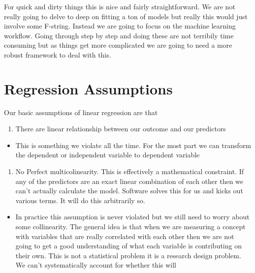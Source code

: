 \documentclass[
  letterpaper,
  DIV=11,
  numbers=noendperiod]{scrreprt}
\providecommand{\tightlist}{%
  \setlength{\itemsep}{0pt}\setlength{\parskip}{0pt}}\usepackage{longtable,booktabs,array}
\begin{document}
For quick and dirty things this is nice and fairly straightforward. We
are not really going to delve to deep on fitting a ton of models but
really this would just involve some F-string. Instead we are going to
focus on the machine learning workflow. Going through step by step and
doing these are not terribily time consuming but as things get more
complicated we are going to need a more robust framework to deal with
this.

\section{Regression Assumptions}\label{regression-assumptions}

Our basic assumptions of linear regression are that

\begin{enumerate}
\def\labelenumi{\arabic{enumi}.}
\tightlist
\item
  There are linear relationship between our outcome and our predictors
\end{enumerate}

\begin{itemize}
\tightlist
\item
  This is something we violate all the time. For the most part we can
  transform the dependent or independent variable to dependent variable
\end{itemize}

\begin{enumerate}
\def\labelenumi{\arabic{enumi}.}
\setcounter{enumi}{1}
\tightlist
\item
  No Perfect multicolinearity. This is effectively a mathematical
  constraint. If any of the predictors are an exact linear combination
  of each other then we can't actually calculate the model. Software
  solves this for us and kicks out various terms. It will do this
  arbitrarily so.
\end{enumerate}

\begin{itemize}
\tightlist
\item
  In practice this assumption is never violated but we still need to
  worry about some collinearity. The general idea is that when we are
  measuring a concept with variables that are really correlated with
  each other then we are not going to get a good understanding of what
  each variable is contributing on their own. This is not a statistical
  problem it is a research design problem. We can't systematically
  account for whether this will
\end{itemize}
\end{document}
